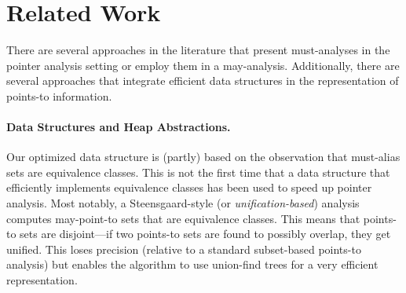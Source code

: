 

\section{Related Work}
\label{sec:related}

There are several approaches in the literature that present
must-analyses in the pointer analysis setting or employ them in a
may-analysis. Additionally, there are several approaches that
integrate efficient data structures in the representation of
points-to information.


\paragraph{Data Structures and Heap Abstractions.}
Our optimized data structure is (partly) based on the observation that
must-alias sets are equivalence classes. This is not the first time
that a data structure that efficiently implements equivalence classes
has been used to speed up pointer analysis. Most notably, a
Steensgaard-style (or \emph{unification-based})
\cite{steensgard:1996:PointsTo} analysis computes may-point-to sets
that are equivalence classes. This means that points-to sets are
disjoint---if two points-to sets are found to possibly overlap, they
get unified. This loses precision (relative to a standard subset-based
points-to analysis) but enables the algorithm to use union-find trees
for a very efficient representation.

